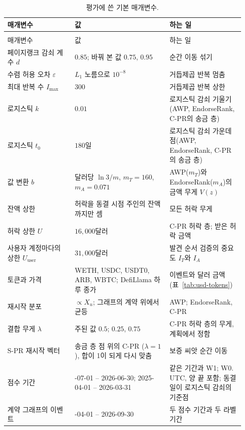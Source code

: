 {\footnotesize{}\setlength{\tabcolsep}{4pt}%
\begin{longtable}{@{}>{\raggedright\arraybackslash}p{0.27\linewidth}>{\raggedright\arraybackslash}p{0.38\linewidth}>{\raggedright\arraybackslash}p{0.30\linewidth}@{}}
\caption{평가에 쓴 기본 매개변수.}\label{tab:parameter-summary}\\
\toprule
매개변수 & 값 & 하는 일 \\
\midrule
\endfirsthead
\multicolumn{3}{l}{\small 표~\thetable\ (이어짐)}\\
\toprule
매개변수 & 값 & 하는 일 \\
\midrule
\endhead
\bottomrule
\endfoot
페이지랭크 감쇠 계수 $d$ & $0.85$; 바꿔 본 값 $0.75$, $0.95$ & 순간 이동 섞기 \\
수렴 허용 오차 $\varepsilon$ & $L_1$ 노름으로 $10^{-8}$ & 거듭제곱 반복 멈춤 \\
최대 반복 수 $I_{\max}$ & $300$ & 거듭제곱 반복 상한 \\
로지스틱 $k$ & $0.01$ & 로지스틱 감쇠 기울기(AWP, EndorseRank, \mbox{C-PR}의 송금 층) \\
로지스틱 $t_0$ & $180$일 & 로지스틱 감쇠 가운데 점(AWP, EndorseRank, \mbox{C-PR}의 송금 층) \\
값 변환 $b$ & 달러당 $\ln 3/m$, $m_T=160$, $m_A=0.071$ & AWP($m_T$)와 EndorseRank($m_A$)의 금액 무게 $V(z)$ \\
잔액 상한 & 허락을 동결 시점 주인의 잔액까지만 셈 & 모든 허락 무게 \\
허락 상한 $U$ & $16{,}000$달러 & \mbox{C-PR} 허락 층; 받은 허락 금액 \\
사용자 계정마다의 상한 $U_{\mathrm{user}}$ & $31{,}000$달러 & 발견 순서 검증의 중요도 $I_T$와 $I_A$ \\
토큰과 가격 & WETH, USDC, USDT0, ARB, WBTC; DefiLlama 하루 종가 & 이벤트와 달러 금액(표~\ref{tab:usd-tokens}) \\
재시작 분포 & $\propto X_u$; 그래프의 계약 위에서 균등 & AWP; EndorseRank, \mbox{C-PR} \\
결합 무게 $\lambda$ & 주된 값 $0.5$; $0.25$, $0.75$ & \mbox{C-PR} 허락 층의 무게, 계획에서 정함 \\
\mbox{S-PR} 재시작 벡터 & 송금 층 점 위의 \mbox{C-PR} ($\lambda=1$), 합이 1이 되게 다시 맞춤 & 보증 씨앗 순간 이동 \\
점수 기간 & 2025-07-01 -- 2026-06-30; 2025-04-01 -- 2026-03-31 & 같은 기간과 W1; W0. UTC, 양 끝 포함; 동결일이 로지스틱 감쇠의 기준점 \\
계약 그래프의 이벤트 & 2025-04-01 -- 2026-09-30 & 두 점수 기간과 두 라벨 기간 \\

\end{longtable}}
